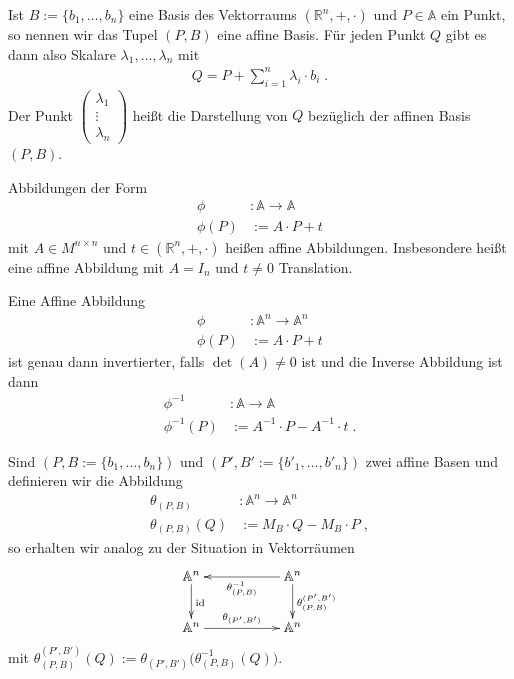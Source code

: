 \begin{Definition}
Ist $B:= \{b_1, \hdots , b_n \}$ eine Basis des Vektorraums  $(\mathbb{R}^n, + , \cdot )$ und $P \in \mathbb{A}$ ein Punkt, so nennen wir das Tupel
$(P, B)$ eine affine Basis. Für jeden Punkt $Q$ gibt es dann also Skalare $\lambda_1,\hdots ,\lambda_n$ mit 
\begin{align*}
Q = P + \sum_{i=1}^{n} \lambda_i \cdot b_i  \; .
\end{align*}
Der Punkt $\begin{pmatrix}  \lambda_1 \\  \vdots \\  \lambda_n \end{pmatrix}$ heißt die Darstellung von $Q$ bezüglich der affinen Basis $(P,B)$. 
\end{Definition}



\begin{Definition}
Abbildungen der Form
\begin{align*}
\phi &: \mathbb{A} \to \mathbb{A} \\
\phi(P) & := A \cdot P + t
\end{align*} 
mit $A \in M^{n \times n}$ und $t \in (\mathbb{R}^n, + , \cdot )$ heißen affine Abbildungen.
Insbesondere heißt eine affine Abbildung mit $A = I_n$ und $t \neq 0$ Translation.
\end{Definition}

\begin{Bemerkung}
Eine Affine Abbildung
\begin{align*}
\phi &: \mathbb{A}^n \to \mathbb{A}^n \\
\phi(P) & := A \cdot P + t
\end{align*} 
ist genau dann invertierter, falls $\det(A) \neq 0$ ist und die Inverse Abbildung ist dann
\begin{align*}
\phi^{-1} &: \mathbb{A} \to \mathbb{A} \\
\phi^{-1}(P) & := A^{-1} \cdot P - A^{-1} \cdot t \; .
\end{align*} 
\end{Bemerkung}


\begin{Definition}
Sind $(P,B:= \{b_1, \hdots , b_n \})$  und $(P',B':= \{b'_1, \hdots , b'_n \})$ zwei affine Basen  und definieren wir 
die Abbildung
\begin{align*}
\theta_{(P,B)} & :  \mathbb{A}^n \to \mathbb{A}^n \\
\theta_{(P,B)}(Q) & := M_B \cdot Q - M_B \cdot P \; ,
\end{align*}
so erhalten wir analog zu der Situation in Vektorräumen
\begin{align*}
\xymatrix{
\mathbb{A}^n  \ar[d]^{\text{id}} &  & \ar[ll]^{\theta_{(P,B)}^{-1}} \mathbb{A}^n \ar[d]^{\theta_{(P,B)}^{(P',B')}} \\
\mathbb{A}^n  \ar[rr]^{\theta_{(P',B')}} & &  \mathbb{A}^n
}
\end{align*}
mit $\theta_{(P,B)}^{(P',B')} (Q) :=   \theta_{(P',B')} \biggl ( \theta_{(P,B)}^{-1} (Q) \biggr)$.
\end{Definition}


